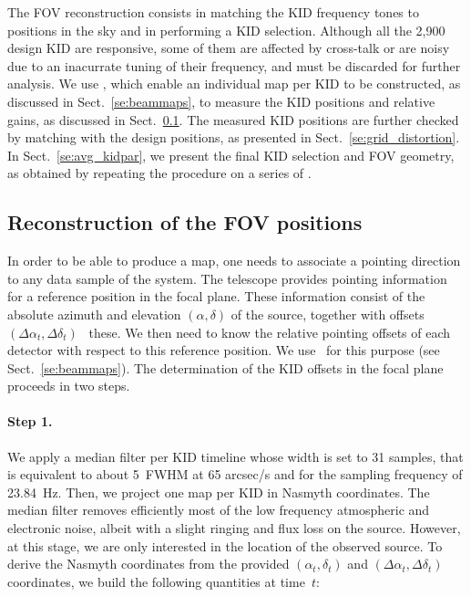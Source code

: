 
The FOV reconstruction consists in matching the KID frequency tones
to positions in the sky and in performing a KID selection. Although all
the 2,900 design KID are responsive, some of them are affected by
cross-talk or are noisy due to an inacurrate tuning of their
frequency, and must be discarded for further analysis. We use \bms,
which enable an individual map per KID to be constructed, as discussed in
Sect.~\ref{se:beammaps}, to measure the KID positions and relative gains, as
discussed in Sect.~\ref{se:fov_geometry}. The measured KID positions
are further
checked by matching with the design positions, as presented in
Sect.~\ref{se:grid_distortion}. In Sect.~\ref{se:avg_kidpar}, we
present the final KID selection and FOV geometry, as obtained by
repeating the procedure on a series of \bms.  



\subsection{Reconstruction of the FOV positions}
\label{se:fov_geometry}

In order to be able to produce a map, one needs to associate a pointing
direction to any data sample of the system. The telescope provides
pointing information for a reference position in the focal
plane. These information consist of the
absolute azimuth and elevation $(\alpha,\delta)$ of the source, together with
offsets $(\Delta\alpha_t, \Delta\delta_t)$ \wrt~these.
We then need to know the relative pointing offsets of each detector
with respect to this reference position. We use
\bms\ for this purpose (see Sect.~\ref{se:beammaps}). The determination of the
KID offsets in the focal plane proceeds in two steps.

\paragraph{Step 1.} We apply a median filter per
KID timeline whose width is set to 31 samples, that is equivalent to
about 5~FWHM at 65 arcsec/s and for the sampling frequency of
23.84~Hz. Then, we project one map per KID in Nasmyth
coordinates. The median filter removes
efficiently most of the low frequency atmospheric and electronic
noise, albeit with a slight ringing and flux loss on the
source. However, at this stage, we are only interested in the location
of the observed source.
To derive the Nasmyth coordinates from the
provided $(\alpha_t,\delta_t)$ and $(\Delta\alpha_t,\Delta\delta_t)$
coordinates, we build the following quantities at time~$t$:

